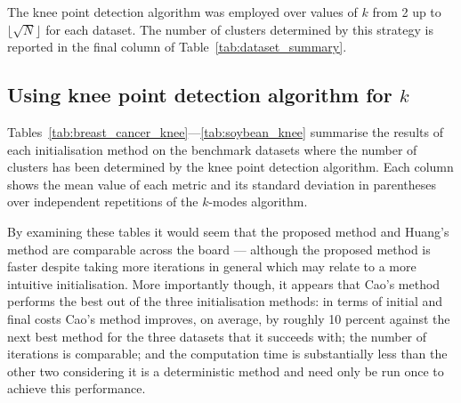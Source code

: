 The knee point detection algorithm was employed over values of \(k\) from 2 up
to \(\lfloor\sqrt N\rfloor\) for each dataset. The number of clusters determined
by this strategy is reported in the final column of
Table~\ref{tab:dataset_summary}.


\subsection{Using knee point detection algorithm for \(k\)}\label{subsec:knee}
\graphicspath{{./img/knee/}}

Tables~\ref{tab:breast_cancer_knee}---\ref{tab:soybean_knee}
summarise the results of each initialisation method on the benchmark datasets
where the number of clusters has been determined by the knee point detection
algorithm. Each column shows the mean value of each metric and its standard
deviation in parentheses over independent
repetitions of the \(k\)-modes algorithm.

\begin{table}[htbp]
    \centering
    \resizebox{\tablewidth}{!}{%
        
    }
    \label{tab:breast_cancer_knee}\vspace{20pt}

    \resizebox{\tablewidth}{!}{%
        
    }
    \label{tab:mushroom_knee}\vspace{20pt}

    \resizebox{\tablewidth}{!}{%
        
    }
    \label{tab:nursery_knee}\vspace{20pt}

    \resizebox{\tablewidth}{!}{%
        
    }
    \label{tab:soybean_knee}
\end{table}

By examining these tables it would seem that the proposed method and Huang's
method are comparable across the board --- although the proposed method is
faster despite taking more iterations in general which may relate to a more
intuitive initialisation. More importantly though, it appears that Cao's method
performs the best out of the three initialisation methods: in terms of initial
and final costs Cao's method improves, on average, by roughly 10 percent against
the next best method for the three datasets that it succeeds with; the number of
iterations is comparable; and the computation time is substantially less than
the other two considering it is a deterministic method and need only be run once
to achieve this performance.

